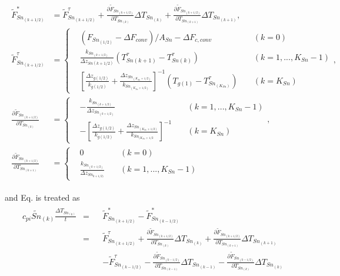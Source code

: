 \begin{eqnarray}
\begin{aligned}
\widetilde{F}_{Sn_{(k+1/2)}}^{\ast}
 &= \widetilde{F}_{Sn_{(k+1/2)}}^{\tau}
 + \frac{\partial \widetilde{F}_{Sn_{(k+1/2)}}}{\partial T_{Sn_{(k)}}} \Delta T_{Sn_{(k)}}
 + \frac{\partial \widetilde{F}_{Sn_{(k+1/2)}}}{\partial T_{Sn_{(k+1)}}} \Delta T_{Sn_{(k+1)}}, \\
\widetilde{F}_{Sn_{(k+1/2)}}^{\tau}
 &= \left\{ \begin{aligned}
 & (F_{Sn_{(1/2)}} - \Delta F_{conv}) / A_{Sn} - \Delta F_{c,conv}
 \; && (k = 0) \\
 & \frac{k_{Sn_{(k+1/2)}}}{\Delta z_{Sn(k+1/2)}} (T_{Sn(k+1)}^\tau - T_{Sn(k)}^\tau)
 \; && (k = 1, ..., K_{Sn}-1) \\
 & \left[
  \frac{\Delta z_{g(1/2)}}{k_{g(1/2)}}
  + \frac{\Delta z_{Sn_{(K_{Sn}+1/2)}}}{k_{Sn_{(K_{Sn}+1/2)}}}
 \right]^{-1} (T_{g(1)} - T_{Sn_{(K_{Sn})}}^\tau)
 \; && (k = K_{Sn})
\end{aligned} \right., \\
\frac{\partial \widetilde{F}_{Sn_{(k+1/2)}}}{\partial T_{Sn_{(k)}}}
 &= \left\{ \begin{aligned}
 & -\frac{k_{Sn_{(k+1/2)}}}{\Delta z_{Sn_{(k+1/2)}}}
 \; &&(k = 1, ..., K_{Sn}-1) \\
 & -\left[ \frac{\Delta z_{g(1/2)}}{k_{g(1/2)}}
  + \frac{\Delta z_{Sn_{(K_{Sn}+1/2)}}}{k_{Sn_{(K_{Sn}+1/2}}}
 \right]^{-1}
 \; &&(k = K_{Sn})
\end{aligned} \right., \\
\frac{\partial\widetilde{F}_{Sn_{(k+1/2)}}}{\partial T_{Sn_{(k+1)}}}
 &= \left\{ \begin{aligned}
 & 0
 \; &&(k = 0) \\
 & \frac{k_{Sn_{(k+1/2)}}}{\Delta z_{Sn_{k+1/2)}}}
 \; &&(k = 1, ..., K_{Sn}-1)
\end{aligned} \right.
\end{aligned} \label{8-35}
\end{eqnarray}

and Eq. \hyperref[8-29]{} is treated as \begin{eqnarray}
\begin{aligned}
 c_{pi}\widetilde{Sn}_{(k)} \frac{\Delta T_{Sn_{(k)}}}{t}
 &= &&\widetilde{F}_{Sn_{(k+1/2)}}^{\ast} - \widetilde{F}_{Sn_{(k-1/2)}}^{\ast} \\
 &= &&\widetilde{F}_{Sn_{(k+1/2)}}^{\tau}
  + \frac{\partial \widetilde{F}_{Sn_{(k+1/2)}}}{\partial T_{Sn_{(k)}}}   \Delta T_{Sn_{(k)}}
  + \frac{\partial \widetilde{F}_{Sn_{(k+1/2)}}}{\partial T_{Sn_{(k+1)}}} \Delta T_{Sn_{(k+1)}} \\
 & &&- \widetilde{F}_{Sn_{(k-1/2)}}^{\tau}
  - \frac{\partial \widetilde{F}_{Sn_{(k-1/2)}}}{\partial T_{Sn_{(k-1)}}} \Delta T_{Sn_{(k-1)}}
  - \frac{\partial \widetilde{F}_{Sn_{(k-1/2)}}}{\partial T_{Sn_{(k)}}}   \Delta T_{Sn_{(k)}}
\end{aligned} \label{8-36}
\end{eqnarray}

